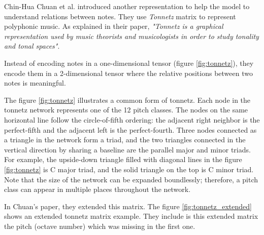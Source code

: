 \documentclass[12pt]{report}
\begin{document}
\bigskip

Chin-Hua Chuan et al. \cite{chuan_modeling_nodate} introduced another representation to help the model to understand relations between notes.
They use \textit{Tonnetz} matrix \cite{mason_essential_nodate} to represent polyphonic music.
As explained in their paper, \textit{"Tonnetz is a graphical representation used by music theorists and musicologists in order to study tonality and tonal spaces"}.

Instead of encoding notes in a one-dimensional tensor (figure \ref{fig:tonnetz}), they encode them in a 2-dimensional tensor where the relative positions between two notes is meaningful.

The figure \ref{fig:tonnetz} illustrates a common form of tonnetz.
Each node in the tonnetz network represents one of the 12 pitch classes.
The nodes on the same horizontal line follow the circle-of-fifth ordering: the adjacent right neighbor is the perfect-fifth and the adjacent left is the perfect-fourth.
Three nodes connected as a triangle in the network form a triad, and the two triangles connected in the vertical direction by sharing a baseline are the parallel major and minor triads.
For example, the upside-down triangle filled with diagonal lines in the figure \ref{fig:tonnetz} is C major triad, and the solid triangle on the top is C minor triad. Note that the size of the network can be expanded boundlessly; therefore, a pitch class can appear in multiple places throughout the network.

In Chuan's paper, they extended this matrix.
The figure \ref{fig:tonnetz_extended} shows an extended tonnetz matrix example.
They include is this extended matrix the pitch (octave number) which was missing in the first one.
\end{document}
